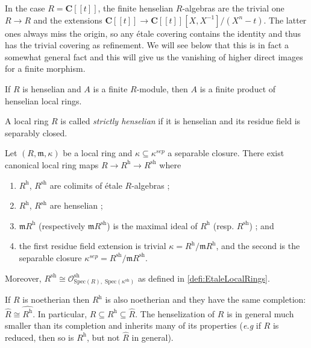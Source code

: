 \begin{example}
In the case $R = \mathbf{C} [[ t ]]$, the finite henselian $R$-algebras are the 
trivial one $R \to R$ and the extensions $ \mathbf{C} [[ t ]] \to \mathbf{C} [[ 
t ]] [X, X^{-1}]/(X^n-t)$. The latter ones always miss the origin, so any 
\'etale covering contains the identity and thus has the trivial covering as 
refinement. We will see below that this is in fact a somewhat general fact and 
this will give us the vanishing of higher direct images for a finite morphism.
\end{example}

\begin{lemma} \label{cor:FiniteOverHenselianIs Henselian}
If $R$ is henselian and $A$ is a finite $R$-module, then $A$ is a finite 
product of henselian local rings. 
\end{lemma}

\begin{definition} 
A local ring $R$ is called \emph{strictly henselian} if it is henselian and its 
residue field is separably closed. 
\end{definition}

\begin{theorem}
Let $(R, \mathfrak m, \kappa)$ be a local ring and 
$\kappa\subseteq\kappa^{sep}$ a separable closure. There exist canonical local 
ring maps $ R\to R^\text{h} \to R^\text{sh}$ where
\begin{enumerate}
\item $R^\text{h}$, $R^\text{sh}$ are colimits of \'etale $R$-algebras ;
\item $R^\text{h}$, $R^\text{sh}$ are henselian ;
\item $\mathfrak m R^\text{h}$ (respectively $\mathfrak m R^\text{sh}$) is the 
maximal ideal of $R^\text{h}$ (resp. $R^\text{sh}$) ; and 
\item the first residue field extension is trivial $\kappa=R^\text{h}/\mathfrak 
m R^\text{h}$, and the second is the separable closure $\kappa^{sep} = 
R^\text{sh}/\mathfrak m R^\text{sh}$. 
\end{enumerate} 
Moreover, $R^\text{sh}\cong \mathcal{O}^\text{sh}_{\text{Spec}(R), \; 
\text{Spec}(\kappa^\text{sh})}$ as defined in \ref{defi:EtaleLocalRings}.
\end{theorem}

\begin{remark} 
If $R$ is noetherian then $R^\text{h}$ is also noetherian and they have the 
same completion: $\hat R\cong \widehat{R^\text{h}}$. In particular, $R\subseteq 
R^\text{h} \subseteq \hat R$. The henselization of $R$ is in general much 
smaller than its completion and inherits many of its properties ({\it e.g} if 
$R$ is reduced, then so is $R^\text{h}$, but not $\hat R$ in general).
\end{remark}

